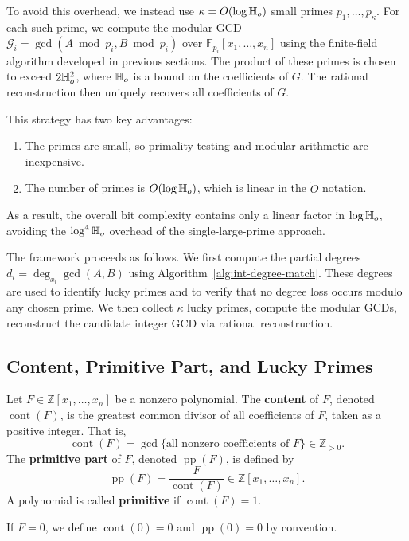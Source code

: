 \documentclass{article}
\numberwithin{equation}{section}
\begin{document}
To avoid this overhead, we instead use \(\kappa = O(\log \mathbb{H}_{o})\) small primes \(p_1,\dots,p_\kappa\). 
For each such prime, we compute the modular GCD \(\mathcal{G}_{i} = \gcd(A \bmod p_i, B \bmod p_i)\) over
\(\mathbb{F}_{p_i}[x_1,\dots,x_n]\) using the finite-field algorithm developed in previous sections.
The product of these primes is chosen to exceed \(2\mathbb{H}_{o}^2\), where \(\mathbb{H}_{o}\) is a bound on the coefficients
of $G$. The rational reconstruction then uniquely recovers all coefficients of \(G\).

This strategy has two key advantages:
\begin{enumerate}
    \item The primes are small, so primality testing and modular arithmetic are inexpensive.
    \item The number of primes is \(O(\log \mathbb{H}_{o})\), which is linear in the \(\widetilde{O}\) notation.
\end{enumerate}

As a result, the overall bit complexity contains only a linear factor in \(\log \mathbb{H}_{o}\), 
avoiding the \(\log^4 \mathbb{H}_{o}\) overhead of the single-large-prime approach.

The framework proceeds as follows. We first compute the partial degrees \(d_i = \deg_{x_i} \gcd(A,B)\)
using Algorithm~\ref{alg:int-degree-match}. These degrees are used to identify lucky primes and to
verify that no degree loss occurs modulo any chosen prime. We then collect \(\kappa\) lucky primes,
compute the modular GCDs, reconstruct the candidate integer GCD via rational reconstruction.



\subsection{Content, Primitive Part, and Lucky Primes}
\label{sec:lucky-primes}

Let $F \in \mathbb{Z}[x_1, \dots, x_n]$ be a nonzero polynomial. The \textbf{content} of $F$, denoted $\operatorname{cont}(F)$, is the greatest common divisor of all coefficients of $F$, taken as a positive integer. That is,
\[
\operatorname{cont}(F) = \gcd\{ \text{all nonzero coefficients of } F \} \in \mathbb{Z}_{>0}.
\]
The \textbf{primitive part} of $F$, denoted $\operatorname{pp}(F)$, is defined by
\[
\operatorname{pp}(F) = \frac{F}{\operatorname{cont}(F)} \in \mathbb{Z}[x_1, \dots, x_n].
\]
A polynomial is called \textbf{primitive} if $\operatorname{cont}(F) = 1$.

If $F = 0$, we define $\operatorname{cont}(0) = 0$ and $\operatorname{pp}(0) = 0$ by convention.
\end{document}

